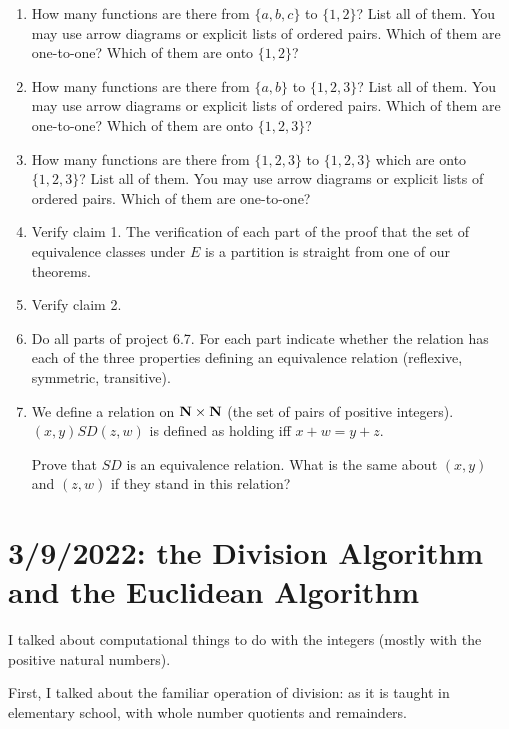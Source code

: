 \documentclass[12pt]{article}
\begin{document}
\begin{enumerate}

\item  How many functions are there from $\{a,b,c\}$ to $\{1,2\}$?  List all of them.  You may use arrow diagrams or explicit lists of ordered pairs.  Which of them are one-to-one?  Which of them are onto $\{1,2\}$?

\item  How many functions are there from $\{a,b\}$ to $\{1,2,3\}$?  List all of them.  You may use arrow diagrams or explicit lists of ordered pairs.  Which of them are one-to-one?  Which of them are onto $\{1,2,3\}$?

\item  How many functions are there from $\{1,2,3\}$ to $\{1,2,3\}$ which are onto $\{1,2,3\}$?  List all of them.  You may use arrow diagrams or explicit lists of ordered pairs.  Which of them are one-to-one?

\item Verify claim 1.  The verification of each part of the proof that the set of equivalence classes under $E$ is a partition is straight from one of our theorems.

\item Verify claim 2.

\item Do all parts of project 6.7. For each part indicate whether the relation has each of the three properties defining an equivalence relation (reflexive, symmetric, transitive).

\item  We define a relation on ${\bf N} \times {\bf N}$ (the set of pairs of positive integers).  $(x,y) SD (z,w)$ is defined as holding iff $x+w=y+z$.

Prove that $SD$ is an equivalence relation.  What is the same about $(x,y)$ and $(z,w)$ if they stand in this relation?

\end{enumerate}

\newpage

\section{3/9/2022:  the Division Algorithm and the Euclidean Algorithm}

I talked about computational things to do with the integers (mostly with the positive natural numbers).

First, I talked about the familiar operation of division:  as it is taught in elementary school, with whole number quotients and remainders.
\end{document}
